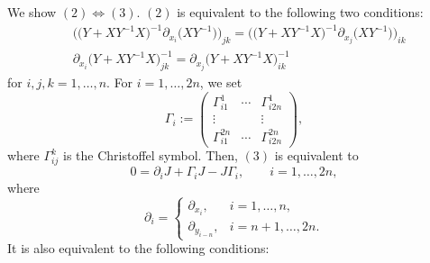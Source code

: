 \documentclass[10pt,a4paper]{amsart}
\numberwithin{equation}{section}
\begin{document}
We show $(2)\Leftrightarrow (3)$. $(2)$ is equivalent to the following two conditions:
\begin{align}
& \bigl(\bigl(Y+XY^{-1}X\bigr)^{-1}\partial_{x_i}\bigl(XY^{-1}\bigr)\bigr)_{jk}=\bigl(\bigl(Y+XY^{-1}X\bigr)^{-1}\partial_{x_j}\bigl(XY^{-1}\bigr)\bigr)_{ik} \label{ReOmega}\\
& \partial_{x_i}\bigl(Y+XY^{-1}X\bigr)^{-1}_{jk}=\partial_{x_j}\bigl(Y+XY^{-1}X\bigr)^{-1}_{ik}\label{ImOmega}
\end{align}
for $i, j, k=1,\ldots , n$. For $i=1, \ldots ,2n$, we set
\[
\Gamma_i:=
\begin{pmatrix}
\Gamma^1_{i 1} & \cdots & \Gamma^1_{i 2n} \\
\vdots & & \vdots \\
\Gamma^{2n}_{i 1} & \cdots & \Gamma^{2n}_{i 2n}
\end{pmatrix},
\]
where $\Gamma_{ij}^k$ is the Christoffel symbol. Then, $(3)$ is equivalent to
\[
0=\partial_iJ+\Gamma_iJ-J\Gamma_i, \qquad i=1,\ldots ,2n,
\]
where
\[
\partial_i=
\begin{cases}
\partial_{x_i}, & i=1,\ldots ,n, \\
\partial_{y_{i-n}}, & i=n+1,\ldots , 2n.
\end{cases}
\]
It is also equivalent to the following conditions:
\end{document}
